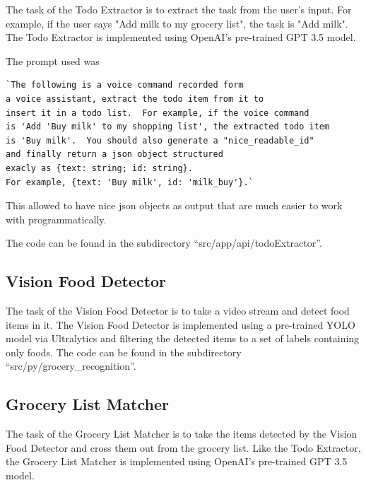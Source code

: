 \documentclass{article}
\begin{document}
The task of the Todo Extractor is to extract the task from the user's input. For example, if the user says "Add milk to my grocery list", the task is "Add milk". The Todo Extractor is implemented using OpenAI's pre-trained GPT 3.5 model.

The prompt used was
\begin{verbatim}
`The following is a voice command recorded form
a voice assistant, extract the todo item from it to
insert it in a todo list.  For example, if the voice command
is 'Add 'Buy milk' to my shopping list', the extracted todo item
is 'Buy milk'.  You should also generate a "nice_readable_id"
and finally return a json object structured
exacly as {text: string; id: string}.
For example, {text: 'Buy milk', id: 'milk_buy'}.`
\end{verbatim}

This allowed to have nice json objects as output that are much easier to work with programmatically.

The code can be found in the subdirectory ``src/app/api/todoExtractor''.


\subsection*{\color{draculayellow}Vision Food Detector}

The task of the Vision Food Detector is to take a video stream and detect food items in it. The Vision Food Detector is implemented using a pre-trained YOLO model via Ultralytics and filtering the detected items to a set of labels containing only foods. The code can be found in the subdirectory ``src/py/grocery\_recognition''.

\subsection*{\color{draculayellow}Grocery List Matcher}

The task of the Grocery List Matcher is to take the items detected by the Vision Food Detector and cross them out from the grocery list. Like the Todo Extractor, the Grocery List Matcher is implemented using OpenAI's pre-trained GPT 3.5 model.
\end{document}
